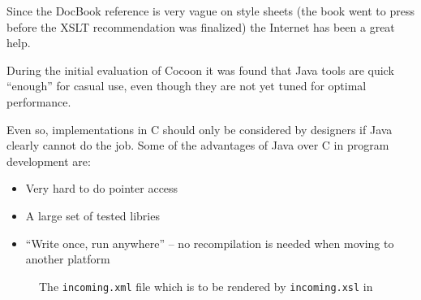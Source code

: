 Since the DocBook reference is very vague on style sheets (the book
went to press before the XSLT recommendation was finalized) the
Internet has been a great help.



      

      

During the initial evaluation of Cocoon it was found that Java tools
are quick ``enough'' for casual use, even though they are not yet
tuned for optimal performance.


Even so, implementations in C should only be considered by designers
if Java clearly cannot do the job.  Some of the advantages of Java
over C in program development are:

\begin{itemize}
\item Very hard to do pointer access
\item A large set of tested libries
\item ``Write once, run anywhere'' -- no recompilation is needed when
  moving to another platform
\end{itemize}

\begin{figure}[tbp]
  \begin{center}
    \caption{The \texttt{incoming.xml} file which is to be rendered by
      \texttt{incoming.xsl} in
      } 
    \label{fig:src-public_html-incoming.xml}
  \end{center}
\end{figure}

